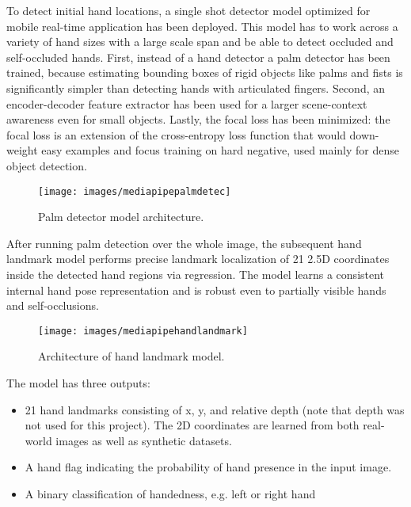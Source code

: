 \noindent To detect initial hand locations, a single shot detector model optimized for mobile real-time application has been deployed. This model has to work across a variety of hand sizes with a large scale span and be able to detect occluded and self-occluded hands. First, instead of a hand detector a palm detector has been trained, because estimating bounding boxes of rigid objects like palms and fists is significantly simpler than detecting hands with articulated fingers. Second, an encoder-decoder feature extractor has been used  for a larger scene-context awareness even for small objects. Lastly, the focal loss has been minimized: the focal loss is an extension of the cross-entropy loss function that would down-weight easy examples and focus training on hard negative, used mainly for dense object detection.

\begin{figure}[H]
	\centering
	\texttt{[image: images/mediapipepalmdetec]}
	\caption[Palm detector model architecture.]{Palm detector model architecture.}
	\label{fig:mediapipepalmdetec}
\end{figure}

\noindent After running palm detection over the whole image, the subsequent hand landmark model performs precise landmark localization of 21 2.5D coordinates inside the detected hand regions via regression. The model learns a consistent internal hand pose representation and is robust even to partially visible hands and self-occlusions.

\begin{figure}[H]
	\centering
	\texttt{[image: images/mediapipehandlandmark]}
	\caption[Architecture of hand landmark model..]{Architecture of hand landmark model.}
	\label{fig:mediapipehandlandmark}
\end{figure}

\noindent The model has three outputs: 

\begin{itemize}
  \item 21 hand landmarks consisting of x, y, and relative depth (note that depth was not used for this project). The 2D coordinates are learned from both real-world images as well as synthetic datasets.
  \item A hand flag indicating the probability of hand presence in the input image.
  \item A binary classification of handedness, e.g. left or right hand
\end{itemize}

